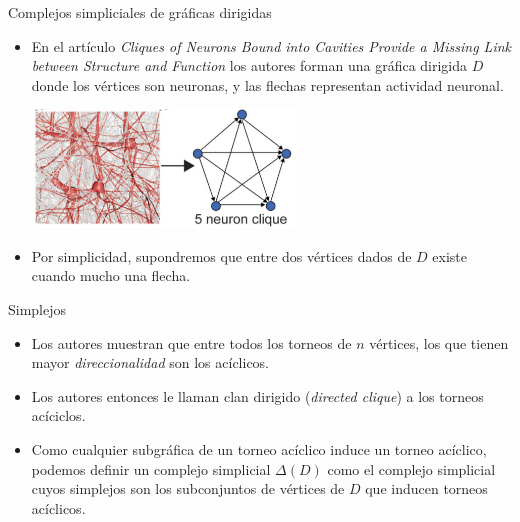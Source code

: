 \documentclass[spanish, presentation, aspectratio=169]{beamer}
\begin{document}
\begin{frame}[label={sec:orga781094}]{Complejos simpliciales de gráficas dirigidas}
\begin{itemize}
\item En el artículo \emph{Cliques of Neurons Bound into Cavities Provide a Missing Link between Structure and Function} los autores forman una gráfica dirigida \(D\) donde los vértices son neuronas, y las flechas representan actividad neuronal.

\begin{center}
\includegraphics[width=7cm]{neuron.png}
\end{center}

\item Por simplicidad, supondremos que entre dos vértices dados de \(D\) existe cuando mucho una flecha.
\end{itemize}
\end{frame}

\begin{frame}[label={sec:org61708af}]{Simplejos}
\begin{itemize}
\item Los autores muestran que entre todos los torneos de \(n\) vértices, los que tienen mayor \emph{direccionalidad} son los acíclicos.

\bigskip

\begin{figure}[htbp]
\centering

\end{figure}
\end{itemize}

\pause\pause

\begin{itemize}
\item Los autores entonces le llaman \alert{clan dirigido} (\emph{directed clique}) a los \alert{torneos acíciclos}.

\item Como cualquier subgráfica de un torneo acíclico induce un torneo acíclico, podemos definir  un complejo simplicial \(\Delta(D)\) como el complejo simplicial cuyos simplejos son los subconjuntos de vértices de \(D\) que inducen torneos acíclicos.
\end{itemize}
\end{frame}
\end{document}
